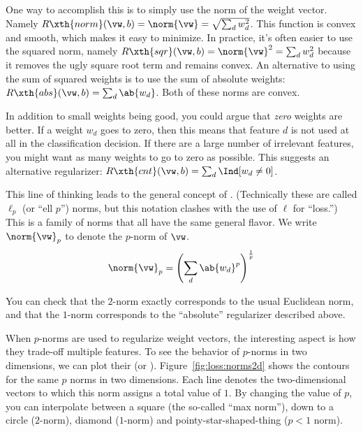 One way to accomplish this is to simply use the norm of the weight
vector.  Namely $R\xth{norm}(\vw,b) = \norm{\vw} = \sqrt{\sum_d
  w_d^2}$.  This function is convex and smooth, which makes it easy to
minimize.  In practice, it's often easier to use the squared norm,
namely $R\xth{sqr}(\vw,b) = \norm{\vw}^2 = \sum_d w_d^2$ because it
removes the ugly square root term and remains convex.  An alternative
to using the sum of squared weights is to use the sum of absolute
weights: $R\xth{abs}(\vw,b) = \sum_d \ab{w_d}$.  Both of these norms
are convex.


In addition to small weights being good, you could argue that
\emph{zero} weights are better.  If a weight $w_d$ goes to zero, then
this means that feature $d$ is not used at all in the classification
decision.  If there are a large number of irrelevant features, you
might want as many weights to go to zero as possible.  This suggests
an alternative regularizer: $R\xth{cnt}(\vw,b) = \sum_d \Ind[w_d \neq
0]$.


This line of thinking leads to the general concept of
.  (Technically these are called $\ell_p$ (or ``ell
$p$'') norms, but this notation clashes with the use of $\ell$ for
``loss.'')  This is a family of norms that all have the same general
flavor.  We write $\norm{\vw}_p$ to denote the $p$-norm of $\vw$.
%
\begin{equation} \label{eq:loss:l}
  \norm{\vw}_p = \left( \sum_d \ab{w_d}^p \right)^{\frac 1 p}
\end{equation}
%


You can check that the $2$-norm exactly corresponds to the usual
Euclidean norm, and that the $1$-norm corresponds to the ``absolute''
regularizer described above.

When $p$-norms are used to regularize weight vectors, the interesting
aspect is how they trade-off multiple features.  To see the behavior
of $p$-norms in two dimensions, we can plot their 
(or ).  Figure~\ref{fig:loss:norms2d} shows the
contours for the same $p$ norms in two dimensions.  Each line denotes
the two-dimensional vectors to which this norm assigns a total value
of $1$.  By changing the value of $p$, you can interpolate between a
square (the so-called ``max norm''), down to a circle ($2$-norm),
diamond ($1$-norm) and pointy-star-shaped-thing ($p<1$ norm).

